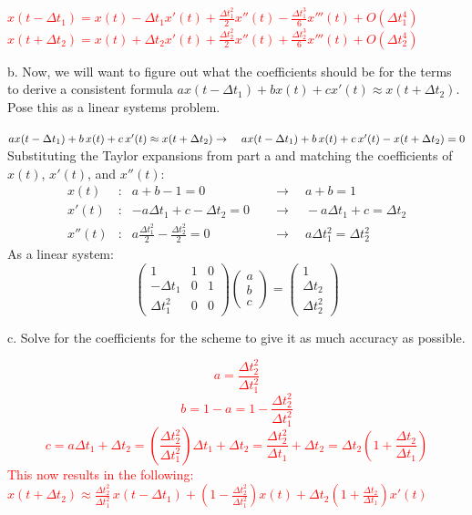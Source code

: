 \documentclass[11pt]{article}
\begin{document}
\textcolor{red}{
$x(t - \Delta t_1) = x(t) - \Delta t_1 x'(t) + \frac{\Delta t_1^2}{2} x''(t) - \frac{\Delta t_1^3}{6} x'''(t) + O(\Delta t_1^4)$\\
$x(t + \Delta t_2) = x(t) + \Delta t_2 x'(t) + \frac{\Delta t_2^2}{2} x''(t) + \frac{\Delta t_2^3}{6} x'''(t) + O(\Delta t_2^4)$
}

b. Now, we will want to figure out what the coefficients should be for the terms to derive a consistent formula $ax(t-\Delta t_1) + bx(t) + cx'(t) \approx x(t+\Delta t_2)$.  Pose this as a linear systems problem.

{\color{red}
$ax(t - \Delta t_1) + b\, x(t) + c\, x'(t) \approx x(t + \Delta t_2)\\
\rightarrow \quad ax(t - \Delta t_1) + b\, x(t) + c\, x'(t) - x(t + \Delta t_2) = 0$
Substituting the Taylor expansions from part a and matching the coefficients of $x(t)$, $x'(t)$, and $x''(t)$:
\begin{align*}
x(t)&: & a + b - 1 = 0 \quad &\rightarrow \quad a + b = 1\\
x'(t)&: & -a\Delta t_1 + c - \Delta t_2 = 0 \quad &\rightarrow \quad -a\Delta t_1 + c = \Delta t_2\\
x''(t)&: & a \frac{\Delta t_1^2}{2} - \frac{\Delta t_2^2}{2} = 0 \quad &\rightarrow \quad a \Delta t_1^2 = \Delta t_2^2
\end{align*}
As a linear system:
\[\begin{pmatrix} 1 & 1 & 0 \\ -\Delta t_1 & 0 & 1 \\ \Delta t_1^2 & 0 & 0 \end{pmatrix}
\begin{pmatrix} a \\ b \\ c \end{pmatrix}
= \begin{pmatrix} 1 \\ \Delta t_2 \\ \Delta t_2^2 \end{pmatrix}\]
}

c. Solve for the coefficients for the scheme to give it as much accuracy as possible.

\textcolor{red}{
\[a = \frac{\Delta t_2^2}{\Delta t_1^2}\]
\[b = 1 - a = 1 - \frac{\Delta t_2^2}{\Delta t_1^2}\]
\[c = a\Delta t_1 + \Delta t_2 = \left(\frac{\Delta t_2^2}{\Delta t_1^2}\right)\Delta t_1 + \Delta t_2 = \frac{\Delta t_2^2}{\Delta t_1} + \Delta t_2 = \Delta t_2\left(1 + \frac{\Delta t_2}{\Delta t_1}\right)\]
This now results in the following:
$x(t + \Delta t_2) \approx \frac{\Delta t_2^2}{\Delta t_1^2}\, x(t - \Delta t_1) + \left(1 - \frac{\Delta t_2^2}{\Delta t_1^2}\right) x(t) + \Delta t_2\left(1 + \frac{\Delta t_2}{\Delta t_1}\right) x'(t)$
}
\end{document}
